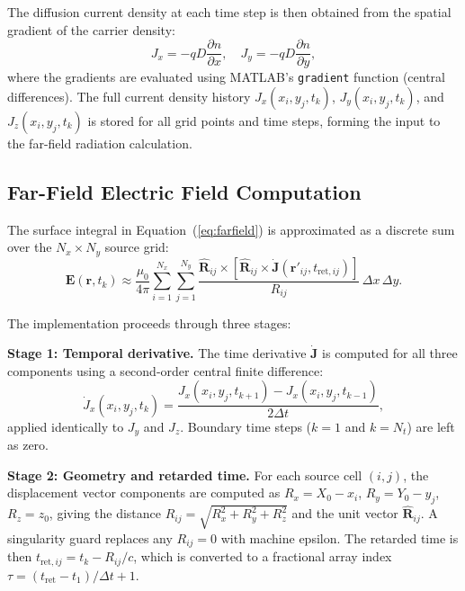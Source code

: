 \documentclass[12pt]{interim_report}
\begin{document}
The diffusion current density at each time step is then obtained from the spatial gradient of the carrier density:
\begin{equation}
    J_x = -qD\frac{\partial n}{\partial x}, \quad J_y = -qD\frac{\partial n}{\partial y},
\end{equation}
where the gradients are evaluated using MATLAB's \texttt{gradient} function (central differences). The full current density history $J_x(x_i, y_j, t_k)$, $J_y(x_i, y_j, t_k)$, and $J_z(x_i, y_j, t_k)$ is stored for all grid points and time steps, forming the input to the far-field radiation calculation.

\subsection{Far-Field Electric Field Computation}
The surface integral in Equation~(\ref{eq:farfield}) is approximated as a discrete sum over the $N_x \times N_y$ source grid:
\begin{equation}
    \mathbf{E}(\mathbf{r}, t_k) \approx \frac{\mu_0}{4\pi} \sum_{i=1}^{N_x} \sum_{j=1}^{N_y} \frac{\hat{\mathbf{R}}_{ij} \times \left[\hat{\mathbf{R}}_{ij} \times \dot{\mathbf{J}}(\mathbf{r}'_{ij}, t_{\mathrm{ret},ij})\right]}{R_{ij}} \, \Delta x \, \Delta y.
    \label{eq:discrete}
\end{equation}

The implementation proceeds through three stages:

\textbf{Stage 1: Temporal derivative.} The time derivative $\dot{\mathbf{J}}$ is computed for all three components using a second-order central finite difference:
\begin{equation}
    \dot{J}_x(x_i, y_j, t_k) = \frac{J_x(x_i, y_j, t_{k+1}) - J_x(x_i, y_j, t_{k-1})}{2\Delta t},
\end{equation}
applied identically to $J_y$ and $J_z$. Boundary time steps ($k=1$ and $k=N_t$) are left as zero.

\textbf{Stage 2: Geometry and retarded time.} For each source cell $(i,j)$, the displacement vector components are computed as $R_x = X_0 - x_i$, $R_y = Y_0 - y_j$, $R_z = z_0$, giving the distance $R_{ij} = \sqrt{R_x^2 + R_y^2 + R_z^2}$ and the unit vector $\hat{\mathbf{R}}_{ij}$. A singularity guard replaces any $R_{ij} = 0$ with machine epsilon. The retarded time is then $t_{\mathrm{ret},ij} = t_k - R_{ij}/c$, which is converted to a fractional array index $\tau = (t_{\mathrm{ret}} - t_1)/\Delta t + 1$.
\end{document}

